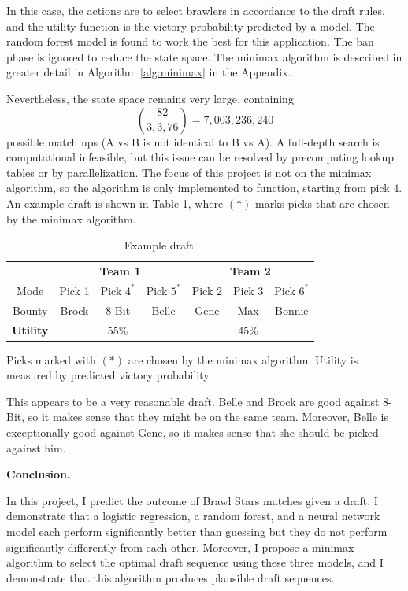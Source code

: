 \documentclass[12pt]{article}
\begin{document}
In this case, the actions are to select brawlers in accordance to the draft rules, and the utility function is the victory probability predicted by a model. The random forest model is found to work the best for this application. The ban phase is ignored to reduce the state space. The minimax algorithm is described in greater detail in Algorithm \ref{alg:minimax} in the Appendix.

Nevertheless, the state space remains very large, containing 
$$\binom{82}{3,3,76} = 7,003,236,240$$
possible match ups (A vs B is not identical to B vs A). A full-depth search is computational infeasible, but this issue can be resolved by precomputing lookup tables or by parallelization. The focus of this project is not on the minimax algorithm, so the algorithm is only implemented to function, starting from pick $4$. An example draft is shown in Table \ref{tab:draft}, where $(*)$ marks picks that are chosen by the minimax algorithm.

\begin{table}[h!]
\centering
\begin{tabular}{c|ccc|ccc}
    & \multicolumn{3}{c|}{\textbf{Team 1}} & \multicolumn{3}{c}{\textbf{Team 2}} \\ 
    Mode & Pick 1 & Pick $4^{*}$ & Pick $5^{*}$ & Pick 2 & Pick 3 & Pick $6^{*}$ \\
    Bounty & Brock & 8-Bit & Belle & Gene & Max & Bonnie \\
    \hline
    \textbf{Utility} & & 55\% & &  & 45\% & 
\end{tabular}
\caption{Example draft.} Picks marked with $(*)$ are chosen by the minimax algorithm. Utility is measured by predicted victory probability.
\label{tab:draft}
\end{table}

This appears to be a very reasonable draft. Belle and Brock are good against 8-Bit, so it makes sense that they might be on the same team. Moreover, Belle is exceptionally good against Gene, so it makes sense that she should be picked against him.

\textbf{Conclusion.}

In this project, I predict the outcome of Brawl Stars matches given a draft. I demonstrate that a logistic regression, a random forest, and a neural network model each perform significantly better than guessing but they do not perform significantly differently from each other. Moreover, I propose a minimax algorithm to select the optimal draft sequence using these three models, and I demonstrate that this algorithm produces plausible draft sequences.
\end{document}
